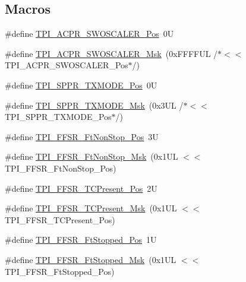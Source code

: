 \subsection*{Macros}
\begin{DoxyCompactItemize}
\item 
\#define \mbox{\hyperlink{group___c_m_s_i_s___t_p_i_ga73adc86f1ee60e5b75d963361535ed24}{T\+P\+I\+\_\+\+A\+C\+P\+R\+\_\+\+S\+W\+O\+S\+C\+A\+L\+E\+R\+\_\+\+Pos}}~0U
\item 
\#define \mbox{\hyperlink{group___c_m_s_i_s___t_p_i_ga73da1dbfb935b27bfd5473d3b041fdb5}{T\+P\+I\+\_\+\+A\+C\+P\+R\+\_\+\+S\+W\+O\+S\+C\+A\+L\+E\+R\+\_\+\+Msk}}~(0x\+F\+F\+F\+F\+U\+L /$\ast$$<$$<$ T\+P\+I\+\_\+\+A\+C\+P\+R\+\_\+\+S\+W\+O\+S\+C\+A\+L\+E\+R\+\_\+\+Pos$\ast$/)
\item 
\#define \mbox{\hyperlink{group___c_m_s_i_s___t_p_i_ga0f302797b94bb2da24052082ab630858}{T\+P\+I\+\_\+\+S\+P\+P\+R\+\_\+\+T\+X\+M\+O\+D\+E\+\_\+\+Pos}}~0U
\item 
\#define \mbox{\hyperlink{group___c_m_s_i_s___t_p_i_gaca085c8a954393d70dbd7240bb02cc1f}{T\+P\+I\+\_\+\+S\+P\+P\+R\+\_\+\+T\+X\+M\+O\+D\+E\+\_\+\+Msk}}~(0x3\+U\+L /$\ast$$<$$<$ T\+P\+I\+\_\+\+S\+P\+P\+R\+\_\+\+T\+X\+M\+O\+D\+E\+\_\+\+Pos$\ast$/)
\item 
\#define \mbox{\hyperlink{group___c_m_s_i_s___t_p_i_ga9537b8a660cc8803f57cbbee320b2fc8}{T\+P\+I\+\_\+\+F\+F\+S\+R\+\_\+\+Ft\+Non\+Stop\+\_\+\+Pos}}~3U
\item 
\#define \mbox{\hyperlink{group___c_m_s_i_s___t_p_i_gaaa313f980974a8cfc7dac68c4d805ab1}{T\+P\+I\+\_\+\+F\+F\+S\+R\+\_\+\+Ft\+Non\+Stop\+\_\+\+Msk}}~(0x1\+U\+L $<$$<$ T\+P\+I\+\_\+\+F\+F\+S\+R\+\_\+\+Ft\+Non\+Stop\+\_\+\+Pos)
\item 
\#define \mbox{\hyperlink{group___c_m_s_i_s___t_p_i_gad30fde0c058da2ffb2b0a213be7a1b5c}{T\+P\+I\+\_\+\+F\+F\+S\+R\+\_\+\+T\+C\+Present\+\_\+\+Pos}}~2U
\item 
\#define \mbox{\hyperlink{group___c_m_s_i_s___t_p_i_ga0d6bfd263ff2fdec72d6ec9415fb1135}{T\+P\+I\+\_\+\+F\+F\+S\+R\+\_\+\+T\+C\+Present\+\_\+\+Msk}}~(0x1\+U\+L $<$$<$ T\+P\+I\+\_\+\+F\+F\+S\+R\+\_\+\+T\+C\+Present\+\_\+\+Pos)
\item 
\#define \mbox{\hyperlink{group___c_m_s_i_s___t_p_i_gaedf31fd453a878021b542b644e2869d2}{T\+P\+I\+\_\+\+F\+F\+S\+R\+\_\+\+Ft\+Stopped\+\_\+\+Pos}}~1U
\item 
\#define \mbox{\hyperlink{group___c_m_s_i_s___t_p_i_ga1ab6c3abe1cf6311ee07e7c479ce5f78}{T\+P\+I\+\_\+\+F\+F\+S\+R\+\_\+\+Ft\+Stopped\+\_\+\+Msk}}~(0x1\+U\+L $<$$<$ T\+P\+I\+\_\+\+F\+F\+S\+R\+\_\+\+Ft\+Stopped\+\_\+\+Pos)
$$
\end{DoxyCompactItemize}
